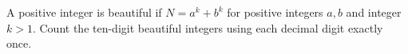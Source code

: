 A positive integer is beautiful if $N=a^k+b^k$ for positive integers $a,b$ and integer $k>1$. Count the ten-digit beautiful integers using each decimal digit exactly once.
